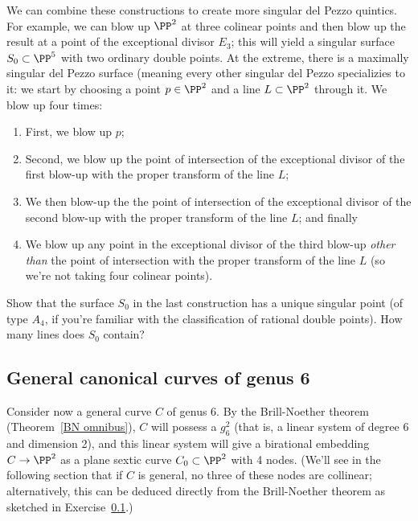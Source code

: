 We can combine these constructions to create more singular del Pezzo quintics. For example, we can blow up $\PP^2$ at three colinear points and then blow up the result at a point of the exceptional divisor $E_3$; this will yield a singular surface $S_0 \subset \PP^5$ with two ordinary double points. At the extreme, there is a maximally singular del Pezzo surface (meaning every other singular del Pezzo specializies to it: we start by choosing a point $p \in \PP^2$ and a line $L \subset \PP^2$ through it. We blow up four times:

\begin{enumerate}
\item First, we blow up $p$;
\item Second, we blow up the point of intersection of the exceptional divisor of the first blow-up with the proper transform of the line $L$;
\item We then blow-up the the point of intersection of the exceptional divisor of the second blow-up with the proper transform of the line $L$; and finally
\item We blow up any point in the exceptional divisor of the third blow-up \emph{other than} the point of intersection  with the proper transform of the line $L$ (so we're not taking four colinear points).
\end{enumerate}

\begin{exercise}
Show that the surface $S_0$ in the last construction has a unique singular point (of type $A_4$, if you're familiar with the classification of rational double points). How many lines does $S_0$ contain?
\end{exercise}

\subsection{General canonical curves of genus 6}

Consider now a general curve $C$ of genus 6. By the Brill-Noether theorem (Theorem~\ref{BN omnibus}), $C$ will possess a $g^2_6$ (that is, a linear system of degree 6 and dimension 2), and this linear system will give a birational embedding $C \to \PP^2$ as a plane sextic curve $C_0 \subset \PP^2$ with 4 nodes. (We'll see in the following section that if $C$ is general, no three of these nodes are collinear; alternatively, this can be deduced directly from the Brill-Noether theorem as sketched in Exercise~\ref{}.) 

